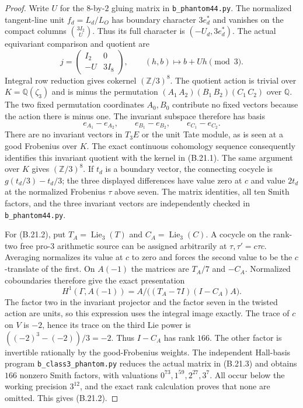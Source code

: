 \begin{proof}
Write $U$ for the $8$-by-$2$ gluing matrix in
\texttt{b\_phantom44.py}. The normalized tangent-line unit
$f_d=L_d/L_O$ has boundary character $3e_d^*$ and vanishes
on the compact columns $\binom{3I_2}{U}$. Thus its full
character is $(-U_d,3e_d^*)$. The actual equivariant
comparison and quotient are
\[
 j=\begin{pmatrix}I_2&0\\-U&3I_8\end{pmatrix},
 \qquad
 (h,b)\longmapsto b+Uh\pmod3.
\]
Integral row reduction gives cokernel $(\mathbb Z/3)^8$.
The quotient action is trivial over $K=\mathbb Q(\zeta_3)$
and is minus the permutation
$(A_1\,A_2)(B_1\,B_2)(C_1\,C_2)$ over $\mathbb Q$.
The two fixed permutation coordinates $A_0,B_0$ contribute
no fixed vectors because the action there is minus one.
The invariant subspace therefore has basis
\[
 e_{A_1}-e_{A_2},\qquad e_{B_1}-e_{B_2},\qquad
 e_{C_1}-e_{C_2}.
\]
There are no invariant vectors in $T_3E$ or the unit
Tate module, as is seen at a good Frobenius over $K$.
The exact continuous cohomology sequence consequently
identifies this invariant quotient with the kernel
in (B.21.1). The same argument over $K$ gives
$(\mathbb Z/3)^8$. If $t_d$ is a boundary vector, the
connecting cocycle is
$g(t_d/3)-t_d/3$; the three displayed differences have
value zero at $c$ and value $2t_d$ at the normalized
Frobenius $\tau$ above seven. The matrix identities, all
ten Smith factors, and the three invariant vectors are
independently checked in \texttt{b\_phantom44.py}.

For (B.21.2), put $T_A=\operatorname{Lie}_3(T)$ and
$C_A=\operatorname{Lie}_3(C)$. A cocycle on the rank-two
free pro-$3$ arithmetic source can be assigned arbitrarily
at $\tau,\tau'=c\tau c$. Averaging normalizes its value
at $c$ to zero and forces the second value to be the
$c$-translate of the first. On $A(-1)$ the matrices are
$T_A/7$ and $-C_A$. Normalized coboundaries therefore give
the exact presentation
\[
 H^1(\Gamma,A(-1))
       =A\big/\bigl((T_A-7I)(I-C_A)A\bigr).                      \tag{B.21.3}
\]
The factor two in the invariant projector and the factor
seven in the twisted action are units, so this expression
uses the integral image exactly.
The trace of $c$ on $V$ is $-2$, hence its trace on
the third Lie power is $((-2)^3-(-2))/3=-2$.
Thus $I-C_A$ has rank $166$. The other factor is
invertible rationally by the good-Frobenius weights.
The independent Hall-basis program
\texttt{b\_class3\_phantom.py} reduces the actual matrix
in (B.21.3) and obtains $166$ nonzero Smith factors,
with valuations
$0^{73},1^{59},2^{27},3^7$. All occur below the working
precision $3^{12}$, and the exact rank calculation
proves that none are omitted. This gives (B.21.2).
\end{proof}

